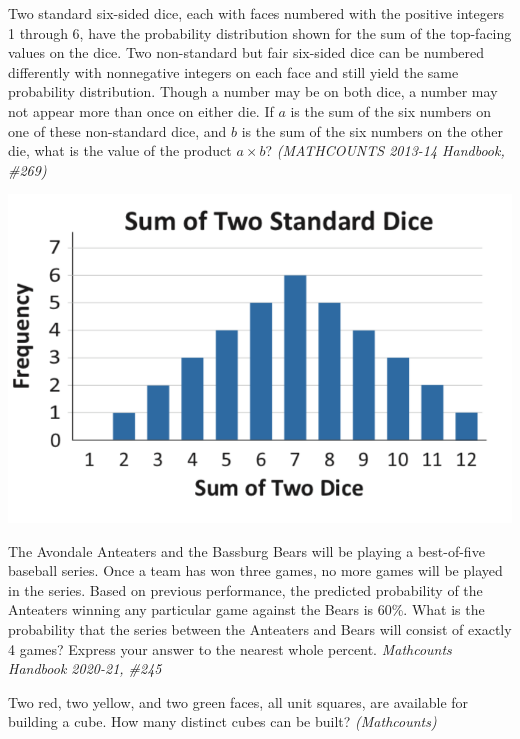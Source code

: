 \documentclass[9pt]{beamer}
\begin{document}
\begin{frame}[t]{7.3}
\begin{block}{}
Two standard six-sided dice, each with faces numbered with the positive integers 1 through 6, have the probability distribution shown for the sum of the top-facing values on the dice. Two non-standard but fair six-sided dice can be numbered differently with nonnegative integers on each face and still yield the same probability distribution. Though a number may be on both dice, a number may not appear more than once on either die. If $a$ is the sum of the six numbers on one of these non-standard dice, and $b$ is the sum of the six numbers on the other die, what is the value of the product $a \times b$?
\textit{(MATHCOUNTS 2013-14 Handbook, \#269)}
\end{block}
    \includegraphics[scale=0.5]{images/hb13_169.png}
\end{frame}

\begin{frame}[t]{7.4}
\begin{block}{}
     The Avondale Anteaters and the Bassburg Bears will be playing a best-of-five baseball series. Once a team has won three games, no more games will be played in the series. Based on previous performance, the predicted probability of the Anteaters winning any particular game against the Bears is 60\%. What is the probability that the series between the Anteaters and Bears will consist of exactly 4 games? Express your answer to the nearest whole percent. \textit{Mathcounts Handbook 2020-21, \#245}
\end{block}
\end{frame}

\begin{frame}[t]{7.5}
\begin{block}{}
     Two red, two yellow, and two green faces, all unit squares, are available for building a cube. How many distinct cubes can be built? \textit{(Mathcounts)}
\end{block}
\end{frame}
\end{document}
